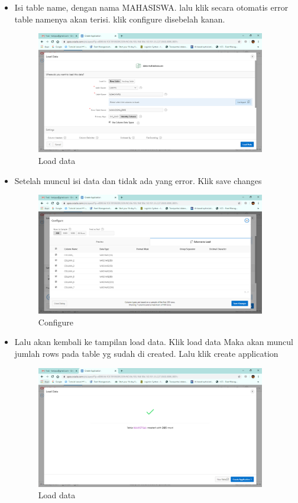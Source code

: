 \begin{itemize}
    \item Isi table name, dengan nama MAHASISWA. lalu klik secara otomatis error table namenya akan terisi. klik configure disebelah kanan. 
    \begin{figure}[!htbp]
        \centering
        \includegraphics[width=10cm]{figures/8.PNG}
        \caption{Load data}
    \end{figure}
    
    \newpage
    
    \item Setelah muncul isi data dan tidak ada yang error. Klik save changes
    \begin{figure}[!htbp]
        \centering
        \includegraphics[width=10cm]{figures/9.PNG}
        \caption{Configure}
    \end{figure}

    \item Lalu akan kembali ke tampilan load data. Klik load data Maka akan muncul jumlah rows pada table yg sudah di created. Lalu klik create application
    \begin{figure}[!htbp]
        \centering
        \includegraphics[width=10cm]{figures/10.PNG}
        \caption{Load data}
    \end{figure}
    

\end{itemize}
